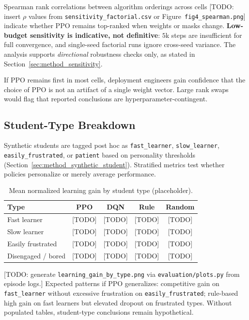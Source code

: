 Spearman rank correlations between algorithm orderings across cells [TODO: insert $\rho$ values from \texttt{sensitivity\_factorial.csv} or Figure~\texttt{fig4\_spearman.png}] indicate whether PPO remains top-ranked when weights or masks change. \textbf{Low-budget sensitivity is indicative, not definitive}: $5$k steps are insufficient for full convergence, and single-seed factorial runs ignore cross-seed variance. The analysis supports \emph{directional} robustness checks only, as stated in Section~\ref{sec:method_sensitivity}.

If PPO remains first in most cells, deployment engineers gain confidence that the choice of PPO is not an artifact of a single weight vector. Large rank swaps would flag that reported conclusions are hyperparameter-contingent.

\subsection{Student-Type Breakdown}\label{sec:results_adapt_student_types}

Synthetic students are tagged post hoc as \texttt{fast\_learner}, \texttt{slow\_learner}, \texttt{easily\_frustrated}, or \texttt{patient} based on personality thresholds (Section~\ref{sec:method_synthetic_student}). Stratified metrics test whether policies personalize or merely average performance.

\begin{table}[H]
\centering
\caption{Mean normalized learning gain by student type (placeholder).}
\label{tab:student_type_breakdown}
\begin{tabular}{lcccc}
\toprule
\textbf{Type} & \textbf{PPO} & \textbf{DQN} & \textbf{Rule} & \textbf{Random} \\
\midrule
Fast learner & [TODO] & [TODO] & [TODO] & [TODO] \\
Slow learner & [TODO] & [TODO] & [TODO] & [TODO] \\
Easily frustrated & [TODO] & [TODO] & [TODO] & [TODO] \\
Disengaged / bored & [TODO] & [TODO] & [TODO] & [TODO] \\
\bottomrule
\end{tabular}
\end{table}

[TODO: generate \texttt{learning\_gain\_by\_type.png} via \texttt{evaluation/plots.py} from episode logs.] Expected patterns if PPO generalizes: competitive gain on \texttt{fast\_learner} without excessive frustration on \texttt{easily\_frustrated}; rule-based high gain on fast learners but elevated dropout on frustrated types. Without populated tables, student-type conclusions remain hypothetical.

